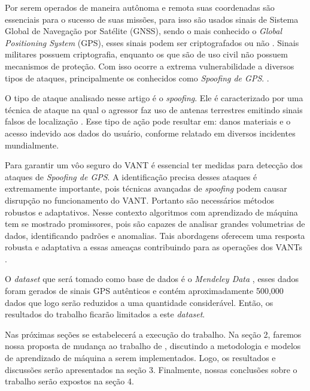 \documentclass[12pt]{article}
\begin{document}
Por serem operados de maneira autônoma e remota suas coordenadas são essenciais
para o sucesso de suas missões, para isso são usados sinais de Sistema Global de Navegação por Satélite (GNSS),
sendo o mais conhecido o \textit{Global Positioning System} (GPS), esses sinais podem ser criptografados ou não
\cite {lester}. Sinais militares possuem criptografia, enquanto os que são de uso civil não possuem mecanismos de proteção.
Com isso ocorre a extrema vulnerabilidade a diversos tipos de ataques, principalmente os conhecidos como \textit{Spoofing de GPS}.
\cite{srinivasansGPSSpoofingDetection2023}.

O tipo de ataque analisado nesse artigo é o \textit{spoofing}. 
Ele é caracterizado por uma técnica de ataque na qual o agressor faz uso de antenas terrestres emitindo sinais falsos
de localização \cite {Spoofing}.
Esse tipo de ação pode resultar em: danos materiais e o acesso indevido aos dados do usuário,
conforme relatado em diversos incidentes mundialmente.
\cite{g1drone2022a,g1drone2022b,bandnews2022,bemparana2022,veja2022,forbes2020,australianaviation2022}

Para garantir um vôo seguro do VANT é essencial ter medidas para detecção dos ataques de \textit{Spoofing de GPS}.
A identificação precisa desses ataques é extremamente importante, pois técnicas avançadas de \textit{spoofing}
podem causar disrupção no funcionamento do VANT. Portanto são necessários métodos robustos e adaptativos.
\cite{isleyenGPSSpoofingDetection2024} Nesse contexto algoritmos com aprendizado de máquina tem se mostrado promissores, pois são capazes de analisar
grandes volumetrias de dados, identificando padrões e anomalias. Tais abordagens oferecem uma resposta robusta e adaptativa a essas ameaças contribuindo para as operações dos VANTs  \cite[tradução nossa]{isleyenGPSSpoofingDetection2024}.


O \textit{dataset} que será tomado como base de dados é o \textit{Mendeley Data} 
\cite{aissou2022dataset}, esses dados foram gerados de sinais GPS autênticos e 
contém aproximadamente 500,000 dados que logo serão reduzidos a uma quantidade
considerável. Então, os resultados do trabalho ficarão
limitados a este \textit{dataset}.

Nas próximas seções se estabelecerá a execução do trabalho. Na seção 2, faremos 
nossa proposta de mudança ao trabalho de \cite{Aissou2021}, discutindo a 
metodologia e modelos de aprendizado de máquina a
serem implementados. Logo, os resultados e 
discussões serão apresentados na seção 3. Finalmente, nossas conclusões sobre o 
trabalho serão expostos na seção 4.
\end{document}
